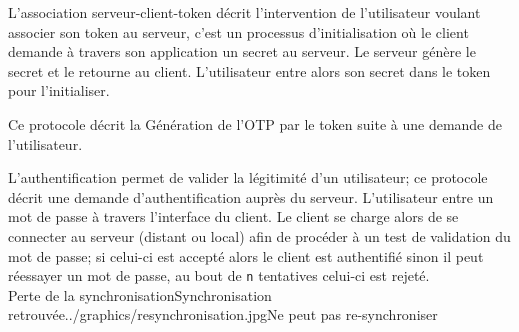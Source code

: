 \documentclass{"../../res/univ-projet"}
\begin{document}
\clearpage


\vspace{0.5cm}


L'association serveur-client-token décrit l'intervention de l'utilisateur voulant associer son token au serveur, c'est un processus d'initialisation où le client
demande à travers son application un secret au serveur. Le serveur génère le secret et le retourne au client. L'utilisateur entre alors son secret dans le token pour l'initialiser.

\vspace{1cm}



\vspace{0.5cm}


Ce protocole décrit la Génération de l'OTP par le token suite à une demande de l'utilisateur.
\\

\vspace{0.5cm}


L'authentification permet de valider la légitimité d'un utilisateur; ce protocole décrit une demande d'authentification auprès du serveur. L'utilisateur
entre un mot de passe à travers l'interface du client. Le client se charge alors de se connecter au serveur (distant ou local) afin de procéder à un test de validation du mot de passe; si celui-ci
est accepté alors le client est authentifié sinon il peut réessayer un mot de passe, au bout de \verb$n$ tentatives celui-ci est rejeté.
\\
{Perte de la synchronisation}{Synchronisation retrouvée}{../graphics/resynchronisation.jpg}{Ne peut pas re-synchroniser}
\end{document}

